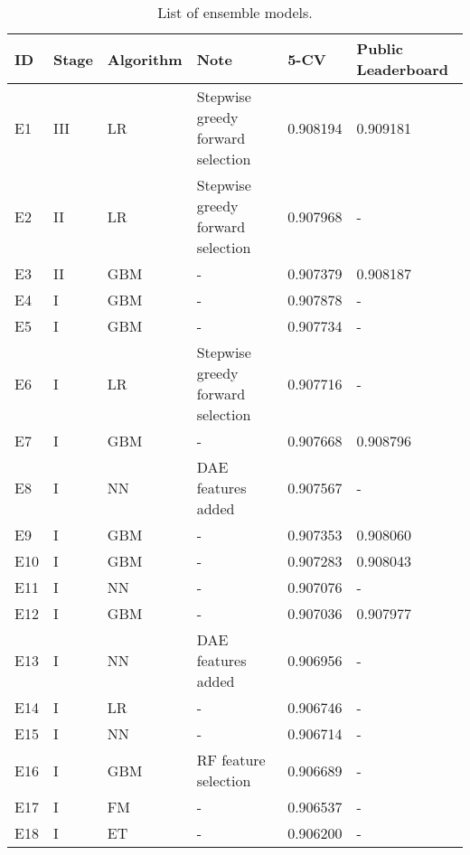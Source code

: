\begin{table*}[]
\begin{center}
\begin{tabular}{llllll}
\label{tb:ensembleModels}
ID	& Stage	& Algorithm	& Note 						& 5-CV		& Public Leaderboard \\ \hline
E1	& III		& LR			& Stepwise greedy forward selection	& 0.908194 	& 0.909181 \\
E2	& II		& LR			& Stepwise greedy forward selection & 0.907968	& - \\
E3	& II		& GBM		& - 							& 0.907379 	& 0.908187 \\
E4 	& I		& GBM		& -							& 0.907878	& - \\
E5	& I		& GBM		& - 							& 0.907734 	& - \\
E6 	& I		& LR			& Stepwise greedy forward selection & 0.907716	& - \\
E7	& I		& GBM		& -							& 0.907668	& 0.908796 \\
E8	& I		& NN		& DAE features added			& 0.907567	& - \\
E9	& I		& GBM		& - 							& 0.907353	& 0.908060 \\
E10	& I		& GBM		& - 							& 0.907283	& 0.908043 \\
E11 	& I		& NN		& - 							& 0.907076	& - \\
E12	& I		& GBM		& - 							& 0.907036	& 0.907977 \\
E13 	& I		& NN		& DAE features added			& 0.906956	& - \\
E14	& I		& LR			& -							& 0.906746	& - \\
E15 	& I		& NN		& -							& 0.906714	& - \\
E16	& I		& GBM		& RF feature selection			& 0.906689	& - \\
E17	& I		& FM		& - 							& 0.906537	& - \\
E18 	& I		& ET			& -							& 0.906200	& - \\
\end{tabular}
\caption{List of ensemble models.}
\end{center}
\end{table*}
